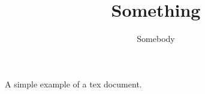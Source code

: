\documentclass{article}
\title{Something}
\author{Somebody}
\begin{document}
\begin{titlepage}
     \maketitle
\end{titlepage}

A simple example of a tex document.
\end{document}
